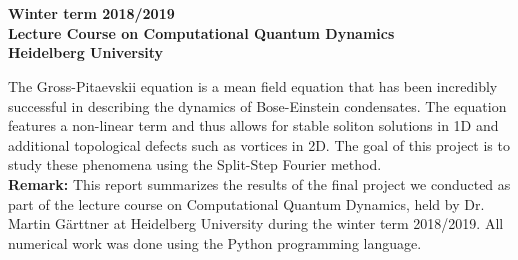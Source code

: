 \begin{center}

	\makeatletter
	\thispagestyle{plain}
	\LARGE\textbf{\@title} \\
	\vspace{2mm}
	\large\bfseries{\@author} \\
	\normalfont
	\vspace{2mm}
	\large{Winter term 2018/2019} \\
	\vspace{2mm}
	\large{Lecture Course on Computational Quantum Dynamics \\
		Heidelberg University} \\
	\makeatother
\end{center}

\normalsize

The Gross-Pitaevskii equation is a mean field equation that has been incredibly successful in describing the dynamics of Bose-Einstein condensates. The equation features a non-linear term and thus allows for stable soliton solutions in 1D and additional topological defects such as vortices in 2D. The goal of this project is to study these phenomena using the Split-Step Fourier method. \\

\textbf{Remark:} This report summarizes the results of the final project we conducted as part of the lecture course on Computational Quantum Dynamics, held by Dr. Martin G\"arttner at Heidelberg University during the winter term 2018/2019. All numerical work was done using the Python programming language. 


